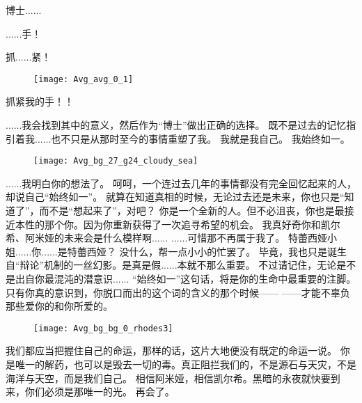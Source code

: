 \documentclass[openany]{book}
\begin{document}
博士......\par
......手！\par
抓......紧！\par
\begin{figure}[h]
    \centering
    \texttt{[image: Avg\_avg\_0\_1]}
\end{figure}
抓紧我的手！！

\begin{dialogue}
     ......我会找到其中的意义，然后作为“博士”做出正确的选择。
     既不是过去的记忆指引着我......也不只是从那时至今的事情重塑了我。
     我就是我自己。
     我始终如一。
    \begin{figure}[h]
        \centering
        \texttt{[image: Avg\_bg\_27\_g24\_cloudy\_sea]}
    \end{figure}
     ......我明白你的想法了。
     呵呵，一个连过去几年的事情都没有完全回忆起来的人，却说自己“始终如一”。
     就算在知道真相的时候，无论过去还是未来，你也只是“知道了”，而不是“想起来了”，对吧？
     你是一个全新的人。但不必沮丧，你也是最接近本性的那个你。因为你重新获得了一次追寻希望的机会。
     我真好奇你和凯尔希、阿米娅的未来会是什么模样啊......
     ......可惜那不再属于我了。
     特蕾西娅小姐......你......是特蕾西娅？
     没什么，帮一点小小的忙罢了。
     毕竟，我也只是诞生自“辩论”机制的一丝幻影。是真是假......本就不那么重要。
     不过请记住，无论是不是出自你最混沌的潜意识......
     “始终如一”这句话，将是你的生命中最重要的注脚。只有你真的意识到，你脱口而出的这个词的含义的那个时候——
     ——才能不辜负那些爱你的和你所爱的。
    \begin{figure}[h]
        \centering
        \texttt{[image: Avg\_bg\_bg\_0\_rhodes3]}
    \end{figure}
     我们都应当把握住自己的命运，那样的话，这片大地便没有既定的命运一说。
     你是唯一的解药，也可以是毁去一切的毒。真正阻拦我们的，不是源石与天灾，不是海洋与天空，而是我们自己。
     相信阿米娅，相信凯尔希。黑暗的永夜就快要到来，你们必须是那唯一的光。
     再会了。
\end{dialogue}
\end{document}
